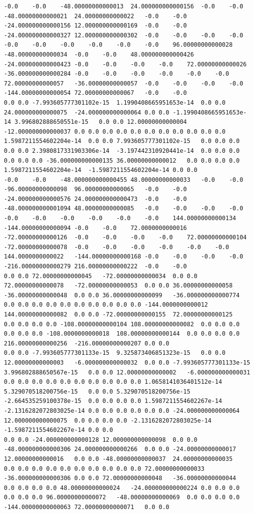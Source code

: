 \documentclass[12pt]{report} %
\begin{document}
\begin{landscape}
\begin{lstlisting}[numbers=none, basicstyle=\ttfamily\tiny, captionpos=b, caption={Matriz de coeficientes $W = G^{-1}$ ($54\times54$) calculada con Julia, sin redondear.}, label=cod:W-julia]
-0.0	-0.0	-48.00000000000013	24.000000000000156	-0.0	-0.0	-48.00000000000021	24.00000000000022	-0.0	-0.0	-24.000000000000156	12.000000000000169	-0.0	-0.0	-24.000000000000327	12.000000000000302	-0.0	-0.0	-0.0	-0.0	-0.0	-0.0	-0.0	-0.0	-0.0	-0.0	96.00000000000028	-48.00000000000034	-0.0	-0.0	48.000000000000426	-24.000000000000423	-0.0	-0.0	-0.0	-0.0	72.00000000000026	-36.000000000000284	-0.0	-0.0	-0.0	-0.0	-0.0	-0.0	72.00000000000057	-36.00000000000057	-0.0	-0.0	-0.0	-0.0	-144.00000000000054	72.00000000000067	-0.0	-0.0
0.0	0.0	-7.993605777301102e-15	1.1990408665951653e-14	0.0	0.0	24.000000000000075	-24.000000000000064	0.0	0.0	-1.1990408665951653e-14	3.996802888650551e-15	0.0	0.0	12.00000000000004	-12.000000000000037	0.0	0.0	0.0	0.0	0.0	0.0	0.0	0.0	0.0	0.0	0.0	1.5987211554602204e-14	0.0	0.0	7.993605777301102e-15	0.0	0.0	0.0	0.0	0.0	2.3980817331903306e-14	-3.197442310920441e-14	0.0	0.0	0.0	0.0	0.0	0.0	-36.000000000000135	36.00000000000012	0.0	0.0	0.0	0.0	1.5987211554602204e-14	-1.5987211554602204e-14	0.0	0.0
-0.0	-0.0	-48.000000000000455	48.00000000000033	-0.0	-0.0	-96.00000000000098	96.00000000000065	-0.0	-0.0	-24.000000000000576	24.000000000000473	-0.0	-0.0	-48.000000000001094	48.00000000000085	-0.0	-0.0	-0.0	-0.0	-0.0	-0.0	-0.0	-0.0	-0.0	-0.0	144.00000000000134	-144.00000000000094	-0.0	-0.0	72.0000000000016	-72.00000000000126	-0.0	-0.0	-0.0	-0.0	72.00000000000104	-72.00000000000078	-0.0	-0.0	-0.0	-0.0	-0.0	-0.0	144.0000000000022	-144.00000000000168	-0.0	-0.0	-0.0	-0.0	-216.00000000000279	216.00000000000222	-0.0	-0.0
0.0	0.0	72.00000000000045	-72.00000000000034	0.0	0.0	72.00000000000078	-72.00000000000053	0.0	0.0	36.00000000000058	-36.00000000000048	0.0	0.0	36.00000000000099	-36.000000000000774	0.0	0.0	0.0	0.0	0.0	0.0	0.0	0.0	0.0	0.0	-144.0000000000012	144.00000000000082	0.0	0.0	-72.00000000000155	72.00000000000125	0.0	0.0	0.0	0.0	-108.00000000000104	108.00000000000082	0.0	0.0	0.0	0.0	0.0	0.0	-108.0000000000018	108.00000000000144	0.0	0.0	0.0	0.0	216.00000000000256	-216.00000000000207	0.0	0.0
0.0	0.0	-7.993605777301133e-15	9.325873406851323e-15	0.0	0.0	12.00000000000003	-6.000000000000032	0.0	0.0	-7.993605777301133e-15	3.996802888650567e-15	0.0	0.0	12.00000000000002	-6.000000000000031	0.0	0.0	0.0	0.0	0.0	0.0	0.0	0.0	0.0	0.0	1.0658141036401512e-14	5.329070518200756e-15	0.0	0.0	5.329070518200756e-15	-2.664535259100378e-15	0.0	0.0	0.0	0.0	1.5987211554602267e-14	-2.1316282072803025e-14	0.0	0.0	0.0	0.0	0.0	0.0	-24.000000000000064	12.000000000000075	0.0	0.0	0.0	0.0	-2.1316282072803025e-14	-1.5987211554602267e-14	0.0	0.0
0.0	0.0	-24.000000000000128	12.000000000000098	0.0	0.0	-48.000000000000306	24.000000000000266	0.0	0.0	-24.00000000000017	12.00000000000016	0.0	0.0	-48.00000000000037	24.00000000000035	0.0	0.0	0.0	0.0	0.0	0.0	0.0	0.0	0.0	0.0	72.00000000000033	-36.000000000000306	0.0	0.0	72.00000000000048	-36.00000000000044	0.0	0.0	0.0	0.0	48.00000000000024	-24.000000000000224	0.0	0.0	0.0	0.0	0.0	0.0	96.00000000000072	-48.00000000000069	0.0	0.0	0.0	0.0	-144.00000000000063	72.00000000000071	0.0	0.0

\end{lstlisting}
\end{landscape}
\end{document}
